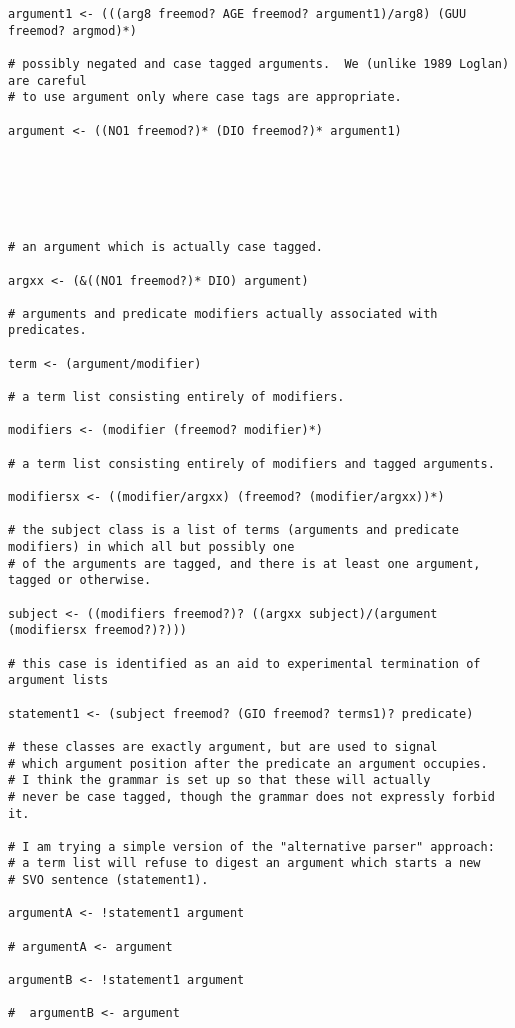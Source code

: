 \documentclass[12pt]{book}
\begin{document}
{\begin{verbatim}
argument1 <- (((arg8 freemod? AGE freemod? argument1)/arg8) (GUU freemod? argmod)*)

# possibly negated and case tagged arguments.  We (unlike 1989 Loglan) are careful
# to use argument only where case tags are appropriate.

argument <- ((NO1 freemod?)* (DIO freemod?)* argument1)






# an argument which is actually case tagged.

argxx <- (&((NO1 freemod?)* DIO) argument)

# arguments and predicate modifiers actually associated with predicates.

term <- (argument/modifier)

# a term list consisting entirely of modifiers.

modifiers <- (modifier (freemod? modifier)*)

# a term list consisting entirely of modifiers and tagged arguments.

modifiersx <- ((modifier/argxx) (freemod? (modifier/argxx))*)

# the subject class is a list of terms (arguments and predicate modifiers) in which all but possibly one
# of the arguments are tagged, and there is at least one argument, tagged or otherwise.

subject <- ((modifiers freemod?)? ((argxx subject)/(argument (modifiersx freemod?)?)))

# this case is identified as an aid to experimental termination of argument lists

statement1 <- (subject freemod? (GIO freemod? terms1)? predicate)

# these classes are exactly argument, but are used to signal
# which argument position after the predicate an argument occupies.
# I think the grammar is set up so that these will actually
# never be case tagged, though the grammar does not expressly forbid it.

# I am trying a simple version of the "alternative parser" approach:
# a term list will refuse to digest an argument which starts a new
# SVO sentence (statement1).

argumentA <- !statement1 argument 

# argumentA <- argument

argumentB <- !statement1 argument 

#  argumentB <- argument


\end{verbatim}}
\end{document}
